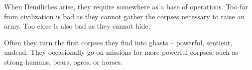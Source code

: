 \begin{multicols}{2}
When Demiliches arise, they require somewhere as a base of operations.
Too far from civilization is bad as they cannot gather the corpses necessary to raise an army.
Too close is also bad as they cannot hide.

Often they turn the first corpses they find into \glspl{ghast} -- powerful, sentient, undead.
They occasionally go on missions for more powerful corpses, such as strong humans, bears, ogres, or horses.

\demilich

\end{multicols}

\section[\Glsfmtplural{artefact}]{~\E}


